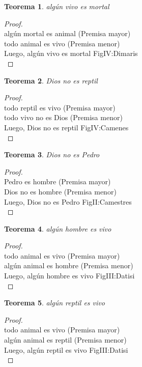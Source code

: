 ﻿\documentclass[12pt]{book}
\newtheorem{theorem}{Teorema}[chapter]
\newtheorem{proof}{Demostración}
\begin{document}
\begin{theorem}
algún vivo es mortal
\label{th: 89}
\end{theorem}\begin{proof}\\algún mortal es animal	 (Premisa mayor) \\todo animal es vivo	 (Premisa menor) \\Luego, algún vivo es mortal	FigIV:Dimaris \\ \end{proof}
\begin{theorem}
Dios no es reptil
\label{th: 90}
\end{theorem}\begin{proof}\\todo reptil es vivo	 (Premisa mayor) \\todo vivo no es Dios	 (Premisa menor) \\Luego, Dios no es reptil	FigIV:Camenes \\ \end{proof}
\begin{theorem}
Dios no es Pedro
\label{th: 91}
\end{theorem}\begin{proof}\\Pedro es hombre	 (Premisa mayor) \\Dios no es hombre	 (Premisa menor) \\Luego, Dios no es Pedro	FigII:Camestres \\ \end{proof}
\begin{theorem}
algún hombre es vivo
\label{th: 92}
\end{theorem}\begin{proof}\\todo animal es vivo	 (Premisa mayor) \\algún animal es hombre	 (Premisa menor) \\Luego, algún hombre es vivo	FigIII:Datisi \\ \end{proof}
\begin{theorem}
algún reptil es vivo
\label{th: 93}
\end{theorem}\begin{proof}\\todo animal es vivo	 (Premisa mayor) \\algún animal es reptil	 (Premisa menor) \\Luego, algún reptil es vivo	FigIII:Datisi \\ \end{proof}
\end{document}
